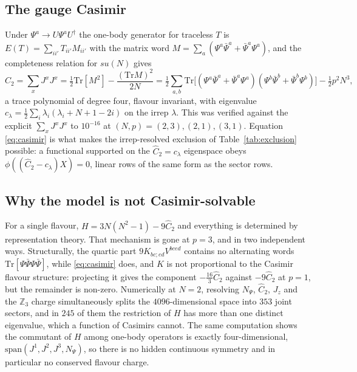 \documentclass[10pt]{article}
\newcommand{\Tr}{\mathrm{Tr}}
\newcommand{\bPsi}{\bar\Psi}
\begin{document}
\subsection{The gauge Casimir}

Under $\Psi^a\to U\Psi^aU^\dagger$ the one-body generator for traceless $T$ is $E(T)=\sum_{ii'}T_{ii'}M_{ii'}$
with the matrix word $M=\sum_a(\Psi^a\bPsi^a+\bPsi^a\Psi^a)$, and the completeness relation for $su(N)$ gives
\begin{equation}
\hat C_2=\sum_xJ^xJ^x=\tfrac12\Tr[M^2]-\frac{(\Tr M)^2}{2N}
=\tfrac12\sum_{a,b}\Tr\big[(\Psi^a\bPsi^a+\bPsi^a\Psi^a)(\Psi^b\bPsi^b+\bPsi^b\Psi^b)\big]-\tfrac12p^2N^3 ,
\label{eq:casimir}
\end{equation}
a trace polynomial of degree four, flavour invariant, with eigenvalue
$c_\lambda=\frac12\sum_i\lambda_i(\lambda_i+N+1-2i)$ on the irrep $\lambda$. This was verified against the
explicit $\sum_xJ^xJ^x$ to $10^{-16}$ at $(N,p)=(2,3),(2,1),(3,1)$. Equation \eqref{eq:casimir} is what makes the
irrep-resolved exclusion of Table~\ref{tab:exclusion} possible: a functional supported on the $\hat C_2=c_\lambda$
eigenspace obeys $\phi((\hat C_2-c_\lambda)X)=0$, linear rows of the same form as the sector rows.

\subsection{Why the model is not Casimir-solvable}

For a single flavour, $H=3N(N^2-1)-9\hat C_2$ and everything is determined by representation theory. That
mechanism is gone at $p=3$, and in two independent ways. Structurally, the quartic part $9K_{bc;ed}V^{bced}$
contains no alternating words $\Tr[\Psi\bPsi\Psi\bPsi]$, while \eqref{eq:casimir} does, and $K$ is not
proportional to the Casimir flavour structure: projecting it gives the component $-\frac{16}{3}\hat C_2$ against
$-9\hat C_2$ at $p=1$, but the remainder is non-zero. Numerically at $N=2$, resolving $N_\Psi$, $\hat C_2$, $J_z$
and the $\mathbb Z_3$ charge simultaneously splits the $4096$-dimensional space into $353$ joint sectors, and in
$245$ of them the restriction of $H$ has more than one distinct eigenvalue, which a function of Casimirs cannot.
The same computation shows the commutant of $H$ among one-body operators is exactly four-dimensional,
$\mathrm{span}(J^1,J^2,J^3,N_\Psi)$, so there is no hidden continuous symmetry and in particular no conserved
flavour charge.
\end{document}
